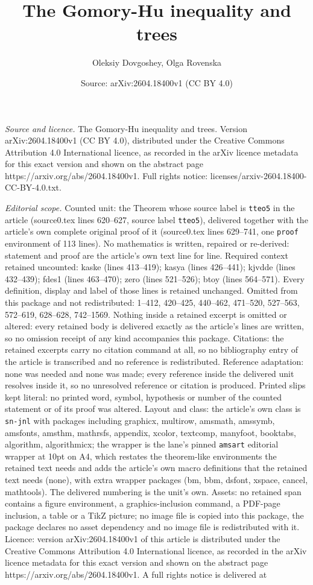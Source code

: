 \documentclass[10pt,a4paper]{amsart}
\title[The Gomory-Hu inequality and trees]{The Gomory-Hu inequality and trees}
\author{Oleksiy Dovgoshey, Olga Rovenska}
\date{Source: arXiv:2604.18400v1 (CC BY 4.0)}
\begin{document}
\maketitle

\noindent\emph{Source and licence.} The Gomory-Hu inequality and trees. Version arXiv:2604.18400v1 (CC BY 4.0), distributed under the Creative Commons Attribution 4.0 International licence, as recorded in the arXiv licence metadata for this exact version and shown on the abstract page https://arxiv.org/abs/2604.18400v1. Full rights notice: licenses/arxiv-2604.18400-CC-BY-4.0.txt.\par\smallskip

\noindent\textit{Editorial scope.} Counted unit: the Theorem whose source label is \texttt{tteo5} in the article (source0.tex lines 620--627, source label \texttt{tteo5}), delivered together with the article's own complete original proof of it (source0.tex lines 629--741, one \texttt{proof} environment of 113 lines). No mathematics is written, repaired or re-derived: statement and proof are the article's own text line for line. Required context retained uncounted: kaske (lines 413--419); kasya (lines 426--441); kjvdde (lines 432--439); fdes1 (lines 463--470); zero (lines 521--526); btoy (lines 564--571). Every definition, display and label of those lines is retained unchanged. Omitted from this package and not redistributed: 1--412, 420--425, 440--462, 471--520, 527--563, 572--619, 628--628, 742--1569. Nothing inside a retained excerpt is omitted or altered: every retained body is delivered exactly as the article's lines are written, so no omission receipt of any kind accompanies this package. Citations: the retained excerpts carry no citation command at all, so no bibliography entry of the article is transcribed and no reference is redistributed. Reference adaptation: none was needed and none was made; every reference inside the delivered unit resolves inside it, so no unresolved reference or citation is produced. Printed slips kept literal: no printed word, symbol, hypothesis or number of the counted statement or of its proof was altered. Layout and class: the article's own class is \texttt{sn-jnl} with packages including graphicx, multirow, amsmath, amssymb, amsfonts, amsthm, mathrsfs, appendix, xcolor, textcomp, manyfoot, booktabs, algorithm, algorithmicx; the wrapper is the lane's pinned \texttt{amsart} editorial wrapper at 10pt on A4, which restates the theorem-like environments the retained text needs and adds the article's own macro definitions that the retained text needs (none), with extra wrapper packages (bm, bbm, dsfont, xspace, cancel, mathtools). The delivered numbering is the unit's own. Assets: no retained span contains a figure environment, a graphics-inclusion command, a PDF-page inclusion, a table or a TikZ picture; no image file is copied into this package, the package declares no asset dependency and no image file is redistributed with it. Licence: version arXiv:2604.18400v1 of this article is distributed under the Creative Commons Attribution 4.0 International licence, as recorded in the arXiv licence metadata for this exact version and shown on the abstract page https://arxiv.org/abs/2604.18400v1. A full rights notice is delivered at 
\end{document}
